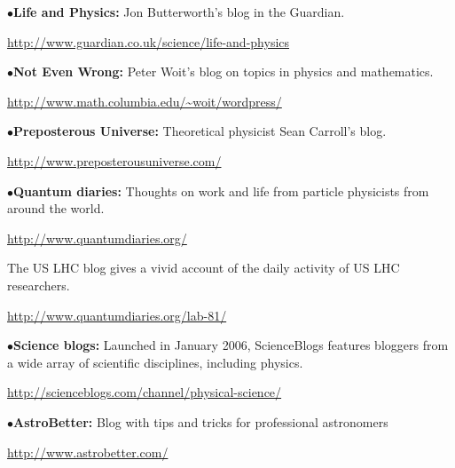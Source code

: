 \medskip

\item{$\bullet$}{\bf Life and Physics:}
Jon Butterworth's blog in the Guardian.
	\item{}\qquad\url{http://www.guardian.co.uk/science/life-and-physics}

\medskip

\item{$\bullet$}{\bf Not Even Wrong:} 
Peter Woit's blog on topics in physics and mathematics.
	\item{}\qquad\url{http://www.math.columbia.edu/~woit/wordpress/}

\medskip


\medskip

\item{$\bullet$}{\bf Preposterous Universe:}
Theoretical physicist Sean Carroll's blog.
	\item{}\qquad\url{http://www.preposterousuniverse.com/}

\medskip

\item{$\bullet$}{\bf Quantum diaries:}
Thoughts on work and life from particle physicists from around the world. 
	\item{}\qquad\url{http://www.quantumdiaries.org/}
\item{}The US LHC blog gives a vivid account of the daily activity of US LHC researchers.
	\item{}\qquad\url{http://www.quantumdiaries.org/lab-81/}

\medskip

\item{$\bullet$}{\bf Science blogs:} 
Launched in January 2006, ScienceBlogs features bloggers from a wide array of scientific disciplines, including physics.
	\item{}\qquad\url{http://scienceblogs.com/channel/physical-science/}

\medskip

\item{$\bullet$}{\bf AstroBetter:} 
Blog with tips and tricks for professional astronomers
	\item{}\qquad\url{http://www.astrobetter.com/}


\medskip


\endRPPonly



